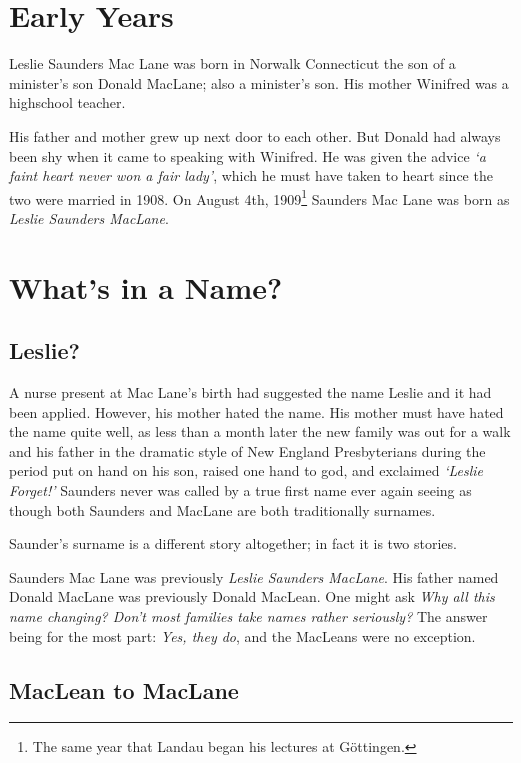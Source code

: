 \section{Early Years}

Leslie Saunders Mac Lane was born in Norwalk Connecticut the son of a minister's son Donald MacLane; also a minister's son. His mother Winifred was a highschool teacher. 

His father and mother grew up next door to each other. But Donald had always been shy when it came to speaking with Winifred. He was given the advice \emph{`a faint heart never won a fair lady'}, which he must have taken to heart since the two were married in 1908. On August 4th, 1909\footnote{The same year that Landau began his lectures at G\"{o}ttingen.}  Saunders Mac Lane was born as \emph{Leslie Saunders MacLane}. 

\section{What's in a Name?}

\subsection{Leslie?}

A nurse present at Mac Lane's birth had suggested the name Leslie and it had been applied. However, his mother hated the name. His mother must have hated the name quite well, as less than a month later the new family was out for a walk and his father in the dramatic style of New England Presbyterians during the period put on hand on his son, raised one hand to god, and exclaimed\cite{Mac2005} \emph{`Leslie Forget!'} Saunders never was called by a true first name ever again seeing as though both Saunders and MacLane are both traditionally surnames. 

Saunder's surname is a different story altogether; in fact it is two stories. 

 Saunders Mac Lane was previously \emph{Leslie Saunders MacLane}. His father named Donald MacLane was previously Donald MacLean. One might ask \emph{Why all this name changing? Don't most families take names rather seriously?} The answer being for the most part: \emph{Yes, they do}, and the MacLeans were no exception.

\subsection{MacLean to MacLane} 

